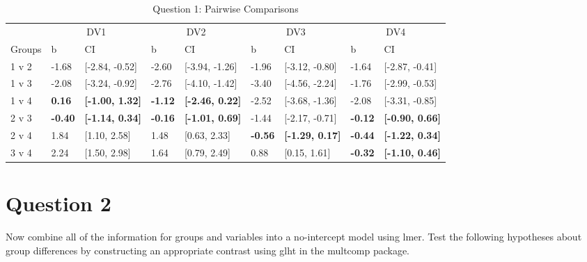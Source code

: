 \documentclass{article}\usepackage[]{graphicx}\usepackage[]{color}
\newenvironment{knitrout}{}{} %
\begin{document}
\begin{knitrout}
\begin{table}
\caption{\label{tab:unnamed-chunk-5}Question 1: Pairwise Comparisons}
\centering
\begin{tabular}[t]{lllllllll}
\toprule
\multicolumn{1}{c}{ } & \multicolumn{2}{c}{DV1} & \multicolumn{2}{c}{DV2} & \multicolumn{2}{c}{DV3} & \multicolumn{2}{c}{DV4} \\
\cmidrule(l{2pt}r{2pt}){2-3} \cmidrule(l{2pt}r{2pt}){4-5} \cmidrule(l{2pt}r{2pt}){6-7} \cmidrule(l{2pt}r{2pt}){8-9}
Groups & b & CI & b & CI & b & CI & b & CI\\
\midrule
1 v 2 & -1.68 & [-2.84, -0.52] & -2.60 & [-3.94, -1.26] & -1.96 & [-3.12, -0.80] & -1.64 & [-2.87, -0.41]\\
1 v 3 & -2.08 & [-3.24, -0.92] & -2.76 & [-4.10, -1.42] & -3.40 & [-4.56, -2.24] & -1.76 & [-2.99, -0.53]\\
1 v 4 & \textbf{0.16} & \textbf{[-1.00, 1.32]} & \textbf{-1.12} & \textbf{[-2.46, 0.22]} & -2.52 & [-3.68, -1.36] & -2.08 & [-3.31, -0.85]\\
2 v 3 & \textbf{-0.40} & \textbf{[-1.14, 0.34]} & \textbf{-0.16} & \textbf{[-1.01, 0.69]} & -1.44 & [-2.17, -0.71] & \textbf{-0.12} & \textbf{[-0.90, 0.66]}\\
2 v 4 & 1.84 & [1.10, 2.58] & 1.48 & [0.63, 2.33] & \textbf{-0.56} & \textbf{[-1.29, 0.17]} & \textbf{-0.44} & \textbf{[-1.22, 0.34]}\\
3 v 4 & 2.24 & [1.50, 2.98] & 1.64 & [0.79, 2.49] & 0.88 & [0.15, 1.61] & \textbf{-0.32} & \textbf{[-1.10, 0.46]}\\
\bottomrule
\end{tabular}
\end{table}


\end{knitrout}



\section{Question 2}
Now combine all of the information for groups and variables into a no-intercept model using lmer\( \). Test the following hypotheses about group differences by constructing an appropriate contrast using glht\( \) in the multcomp package. \\
\end{document}
